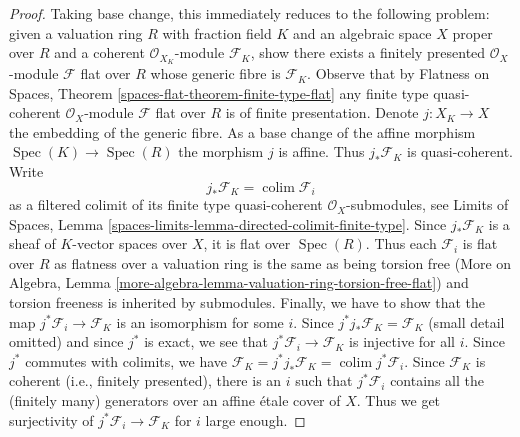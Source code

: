 \documentclass[10pt,a4paper]{amsart}
\theoremstyle{plain}
\theoremstyle{definition}
\theoremstyle{remark}
\numberwithin{equation}{subsection}
\def\colim{\mathop{\mathrm{colim}}\nolimits}
\def\Spec{\mathop{\mathrm{Spec}}}
\begin{document}
\begin{proof}
Taking base change, this immediately reduces to the following
problem: given a valuation ring $R$ with fraction field $K$ and
an algebraic space $X$ proper over $R$ and a coherent
$\mathcal{O}_{X_K}$-module $\mathcal{F}_K$, show there exists
a finitely presented $\mathcal{O}_X$-module $\mathcal{F}$
flat over $R$ whose generic fibre is $\mathcal{F}_K$.
Observe that by Flatness on Spaces, Theorem
\ref{spaces-flat-theorem-finite-type-flat}
any finite type quasi-coherent $\mathcal{O}_X$-module
$\mathcal{F}$ flat over $R$ is of finite presentation.
Denote $j : X_K \to X$ the embedding of the generic fibre.
As a base change of the affine morphism $\Spec(K) \to \Spec(R)$
the morphism $j$ is affine. Thus $j_*\mathcal{F}_K$ is
quasi-coherent. Write
$$
j_*\mathcal{F}_K = \colim \mathcal{F}_i
$$
as a filtered colimit of its finite type quasi-coherent
$\mathcal{O}_X$-submodules, see
Limits of Spaces, Lemma \ref{spaces-limits-lemma-directed-colimit-finite-type}.
Since $j_*\mathcal{F}_K$ is a sheaf of $K$-vector spaces over $X$,
it is flat over $\Spec(R)$. Thus each $\mathcal{F}_i$ is flat
over $R$ as flatness over a valuation ring is the same as being
torsion free
(More on Algebra, Lemma
\ref{more-algebra-lemma-valuation-ring-torsion-free-flat})
and torsion freeness is inherited by submodules.
Finally, we have to show that the map
$j^*\mathcal{F}_i \to \mathcal{F}_K$
is an isomorphism for some $i$.
Since $j^*j_*\mathcal{F}_K = \mathcal{F}_K$ (small detail omitted)
and since $j^*$ is exact, we see that $j^*\mathcal{F}_i \to \mathcal{F}_K$
is injective for all $i$.
Since $j^*$ commutes with colimits, we have
$\mathcal{F}_K = j^*j_*\mathcal{F}_K = \colim j^*\mathcal{F}_i$.
Since $\mathcal{F}_K$ is coherent (i.e., finitely presented),
there is an $i$ such that $j^*\mathcal{F}_i$ contains all the
(finitely many) generators over an affine \'etale cover of $X$.
Thus we get surjectivity of $j^*\mathcal{F}_i \to \mathcal{F}_K$
for $i$ large enough.
\end{proof}
\end{document}
